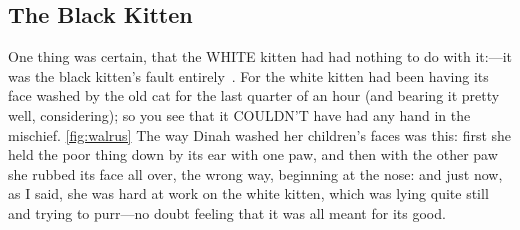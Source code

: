 \subsection{The Black Kitten}
  One thing was certain, that the WHITE kitten had had nothing to
do with it:---it was the black kitten's fault entirely~\cite{aiw}.  For the
white kitten had been having its face washed by the old cat for
the last quarter of an hour (and bearing it pretty well,
considering); so you see that it COULDN'T have had any hand in
the mischief.
\ref{fig:walrus}
  The way Dinah washed her children's faces was this:  first she
held the poor thing down by its ear with one paw, and then with
the other paw she rubbed its face all over, the wrong way,
beginning at the nose:  and just now, as I said, she was hard at
work on the white kitten, which was lying quite still and trying
to purr---no doubt feeling that it was all meant for its good.

  